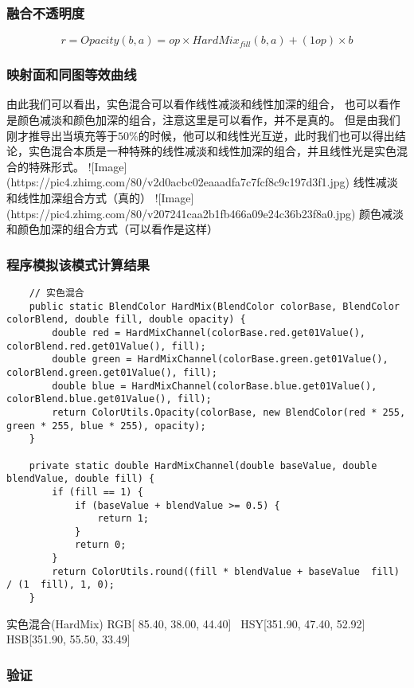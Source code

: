 \subsubsection{ 融合不透明度}

$$r=Opacity(b,a)=op\times HardMix_{fill}(b,a)+(1op)\times b$$

\subsubsection{ 映射面和同图等效曲线}

由此我们可以看出，实色混合可以看作线性减淡和线性加深的组合，
也可以看作是颜色减淡和颜色加深的组合，注意这里是可以看作，并不是真的。
但是由我们刚才推导出当填充等于$50\%$的时候，他可以和线性光互逆，此时我们也可以得出结论，实色混合本质是一种特殊的线性减淡和线性加深的组合，并且线性光是实色混合的特殊形式。
![Image](https://pic4.zhimg.com/80/v2d0acbc02eaaadfa7c7fcf8c9c197d3f1.jpg)
线性减淡和线性加深组合方式（真的）
![Image](https://pic4.zhimg.com/80/v207241caa2b1fb466a09e24c36b23f8a0.jpg)
颜色减淡和颜色加深的组合方式（可以看作是这样）

\subsubsection{ 程序模拟该模式计算结果}

\begin{lstlisting}
	// 实色混合
	public static BlendColor HardMix(BlendColor colorBase, BlendColor colorBlend, double fill, double opacity) {
		double red = HardMixChannel(colorBase.red.get01Value(), colorBlend.red.get01Value(), fill);
		double green = HardMixChannel(colorBase.green.get01Value(), colorBlend.green.get01Value(), fill);
		double blue = HardMixChannel(colorBase.blue.get01Value(), colorBlend.blue.get01Value(), fill);
		return ColorUtils.Opacity(colorBase, new BlendColor(red * 255, green * 255, blue * 255), opacity);
	}
	
	private static double HardMixChannel(double baseValue, double blendValue, double fill) {
		if (fill == 1) {
			if (baseValue + blendValue >= 0.5) {
				return 1;
			}
			return 0;
		}
		return ColorUtils.round((fill * blendValue + baseValue  fill) / (1  fill), 1, 0);
	}
\end{lstlisting}



实色混合(HardMix)       RGB[ 85.40,  38.00,  44.40]~ HSY[351.90,  47.40,  52.92]~ HSB[351.90,  55.50,  33.49]


\subsubsection{ 验证}

